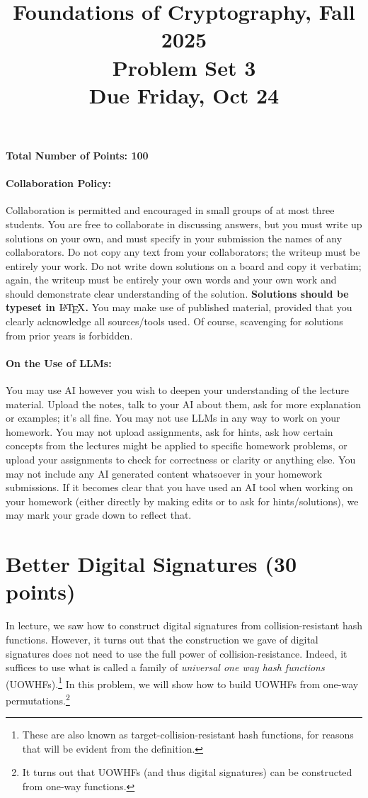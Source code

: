 \documentclass{article}
\title{Foundations of Cryptography, Fall 2025 \\ Problem Set 3 \\ Due Friday, Oct 24}
\date{}
\author{}
\begin{document}
\maketitle

\paragraph{Total Number of Points: 100}

\paragraph{Collaboration Policy:} Collaboration is permitted and encouraged in small groups of at most three students. You are free to collaborate in discussing answers, but you must write up solutions on your own, and must specify in your submission the names of any collaborators. Do not copy any text from your collaborators; the writeup must be entirely your work. Do not write down solutions on a board and copy it verbatim; again, the writeup must be entirely your own words and your own work and should demonstrate clear understanding of the solution. \textbf{Solutions should be typeset in $\text{\LaTeX}$.} You may make use of published material, provided that you clearly acknowledge all sources/tools used. Of course, scavenging for solutions from prior years is forbidden.

\paragraph{On the Use of LLMs:} You may use AI however you wish to deepen your understanding of the lecture material. Upload the notes, talk to your AI about them, ask for more explanation or examples; it's all fine. You may not use LLMs in any way to work on your homework. You may not upload assignments, ask for hints, ask how certain concepts from the lectures might be applied to specific homework problems, or upload your assignments to check for correctness or clarity or anything else. You may not include any AI generated content whatsoever in your homework submissions. If it becomes clear that you have used an AI tool when working on your homework (either directly by making edits or to ask for hints/solutions), we may mark your grade down to reflect that.

\section{Better Digital Signatures (30 points)}
In lecture, we saw how to construct digital signatures from collision-resistant hash functions. However, it turns out that the construction we gave of digital signatures does not need to use the full power of collision-resistance. Indeed, it suffices to use what is called a family of \emph{universal one way hash functions} (UOWHFs).\footnote{These are also known as target-collision-resistant hash functions, for reasons that will be evident from the definition.} In this problem, we will show how to build UOWHFs from one-way permutations.\footnote{It turns out that UOWHFs (and thus digital signatures) can be constructed from one-way functions.} 
\end{document}
